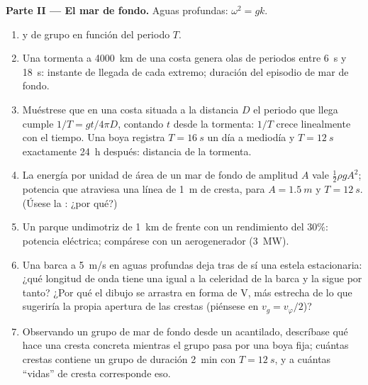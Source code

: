 \begin{problem}
\medskip
\noindent\textbf{Parte II --- El mar de fondo.}
Aguas profundas: $\omega^2 = gk$.
\begin{enumerate}[resume]
  \item {} y de grupo en función del periodo $T$.
  \item Una tormenta a \qty{4000}{km} de una costa genera olas de periodos
        entre \qty{6}{s} y \qty{18}{s}: instante de llegada de cada
        extremo; duración del episodio de mar de fondo.
  \item Muéstrese que en una costa situada a la distancia $D$ el periodo
        que llega cumple $1/T = gt/4\pi D$, contando $t$ desde la
        tormenta: $1/T$ crece linealmente con el tiempo. Una boya registra
        $T = \qty{16}{s}$ un día a mediodía y $T = \qty{12}{s}$ exactamente
        \qty{24}{h} después: distancia de la tormenta.
  \item La energía por unidad de área de un mar de fondo de amplitud $A$ vale $\tfrac12\rho
        gA^2$; potencia que atraviesa una línea de \qty{1}{m} de cresta, para $A =
        \qty{1.5}{m}$ y $T = \qty{12}{s}$. (Úsese la : ¿por qué?)
  \item Un parque undimotriz de \qty{1}{km} de frente con un rendimiento del $30\%$:
        potencia eléctrica; compárese con un aerogenerador (\qty{3}{MW}).
  \item Una barca a \qty{5}{m/s} en aguas profundas deja tras de sí una
        estela estacionaria: ¿qué longitud de onda tiene una  igual a la celeridad de la barca y la sigue por tanto? ¿Por
        qué el dibujo se arrastra en forma de V, más estrecha de lo que
        sugeriría la propia apertura de las crestas (piénsese en $v_g = v_\varphi/2$)?
  \item Observando un grupo de mar de fondo desde un acantilado,
        descríbase qué hace una cresta concreta mientras el grupo pasa
        por una boya fija; cuántas crestas contiene un grupo de duración
        \qty{2}{min} con $T = \qty{12}{s}$, y a cuántas ``vidas'' de
        cresta corresponde eso.
\end{enumerate}


\end{problem}

